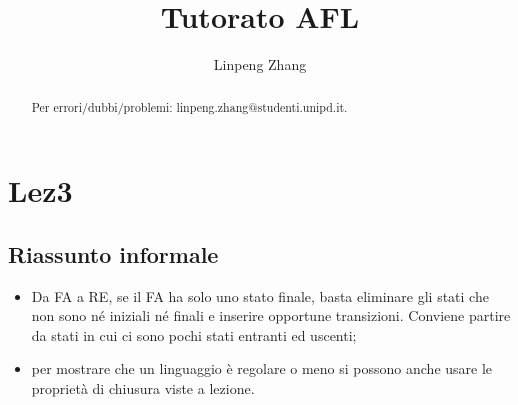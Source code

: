 \documentclass[a4paper,11pt]{article}
\begin{document}
\author{Linpeng Zhang}
\title{Tutorato AFL}
\maketitle
\begin{abstract}
    Per errori/dubbi/problemi: linpeng.zhang@studenti.unipd.it.%
\end{abstract}
\tableofcontents
\section{Lez3}
\subsection{Riassunto informale}
\begin{itemize}
    \item Da FA a RE, se il FA ha solo uno stato finale, basta eliminare gli stati che non sono né iniziali né finali e inserire opportune transizioni. Conviene partire da stati in cui ci sono pochi stati entranti ed uscenti;
    \item per mostrare che un linguaggio è regolare o meno si possono anche usare le proprietà di chiusura viste a lezione.
\end{itemize}
\end{document}
